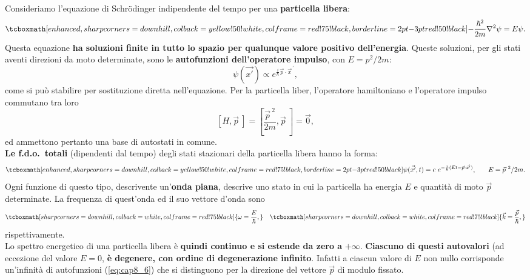 \documentclass[a4paper,12pt,oneside]{book}
\begin{document}
Consideriamo l'equazione di Schr\"{o}dinger indipendente del tempo per una \textbf{particella libera}:
	\begin{equation}
		\tcboxmath[enhanced, sharp corners=downhill, colback=yellow!50!white, colframe=red!75!black, borderline={2pt}{-3pt}{red!50!black}]{
			-\frac{\hbar ^2}{2m}\nabla ^2 \psi = E\psi.
			}
	\end{equation}
Questa equazione \textbf{ha soluzioni finite in tutto lo spazio per qualunque valore positivo dell'energia}. Queste soluzioni, per gli stati aventi direzioni da moto determinate, sono le \textbf{autofunzioni dell'operatore impulso}, con $E= p^2/2m$:
	\begin{equation}
		\psi (\vec{x'}) \propto e ^{\frac{i}{\hbar}\vec{p}\cdot {\vec{x}}^{\, \prime}},
	\end{equation}
come si può stabilire per sostituzione diretta nell'equazione. Per la particella liber, l'operatore hamiltoniano e l'operatore impulso commutano tra loro
	\begin{equation}
		\left[ H, \vec{p}\ \right] = \left[ \frac{ {\vec{p}}^{\ 2}}{2m}, \vec{p}\ \right] =\vec{0},
	\end{equation}
ed ammettono pertanto una base di autostati in comune.\\
\textbf{Le f.d.o.~totali} (dipendenti dal tempo) degli stati stazionari della particella libera hanno la forma:
	\begin{equation}
		\tcboxmath[enhanced, sharp corners=downhill, colback=yellow!50!white, colframe=red!75!black, borderline={2pt}{-3pt}{red!50!black}]{
			\psi (\vec{x'}, t) = c\ e^{-\frac{i}{\hbar} (Et - \vec{p}\cdot \vec{x'})},} \qquad E={\vec{p}}^{\ 2}/{2m}.
	\label{eq:cap8_6}
	\end{equation}
Ogni funzione di questo tipo, descrivente un'\textbf{onda piana}, descrive uno stato in cui la particella ha energia $E$ e quantità di moto $\vec{p}$ determinate. La frequenza di quest'onda ed il suo vettore d'onda sono
	\begin{equation}
		\tcboxmath[sharp corners=downhill, colback=white, colframe=red!75!black]{
		\omega = \frac{E}{\hbar},
		} \quad 
	\tcboxmath[sharp corners=downhill, colback=white, colframe=red!75!black]{
		\vec{k}= \frac{\vec{p}}{\hbar},
		}
	\end{equation}
rispettivamente.\\

Lo spettro energetico di una particella libera è \textbf{quindi continuo e si estende da zero a} $+\infty$. \textbf{Ciascuno di questi autovalori} (ad eccezione del valore $E=0$, \textbf{è degenere, con ordine di degenerazione infinito}. Infatti a ciascun valore di $E$ non nullo corrisponde un'infinità di autofunzioni (\ref{eq:cap8_6}) che si distinguono per la direzione del vettore $\vec{p}$ di modulo fissato.
\end{document}
